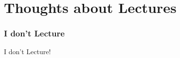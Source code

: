 ﻿\part{Thoughts about Lectures}
\section{I don't Lecture}

\begin{frame}{I don't Lecture!}

\end{frame}
